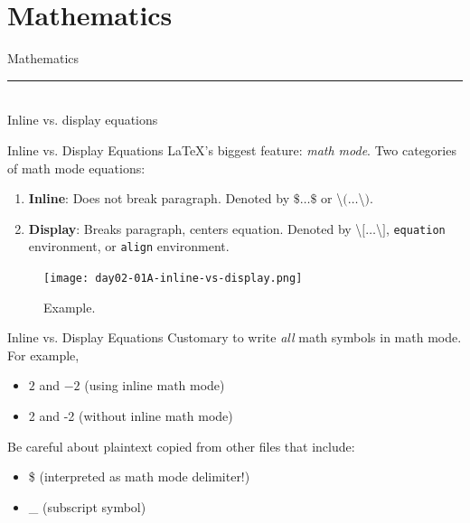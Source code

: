 \documentclass{beamer}
\begin{document}
{  \section{Mathematics}

  \begin{frame}[plain]
    \vfill
    \centering
    \begin{beamercolorbox}[sep=8pt,center,shadow=true,rounded=true]{Mathematics}
      \insertsectionhead\par%
      \color{davisblue}\noindent\rule{10cm}{1pt} \\
      \footnotesize{Inline vs. display equations}
    \end{beamercolorbox}
    \vfill
  \end{frame}

  \begin{frame}{Inline vs. Display Equations}
    \LaTeX's biggest feature: \emph{math mode}. Two categories of math mode equations:
    \begin{enumerate}
      \item \textbf{Inline}: Does not break paragraph. Denoted by $\$\dots\$$ or \textbackslash$(\dots$\textbackslash$)$.
      \item \textbf{Display}: Breaks paragraph, centers equation. Denoted by \textbackslash$[\dots$\textbackslash$]$, \texttt{equation} environment, or \texttt{align} environment.
    \end{enumerate}
    \begin{figure}
      \texttt{[image: day02-01A-inline-vs-display.png]}
      \caption{Example.}
      \label{fig:day02-01}
    \end{figure}
  \end{frame}

  \begin{frame}{Inline vs. Display Equations}
    Customary to write \emph{all} math symbols in math mode. For example,
    \begin{itemize} 
      \item $2$ and $-2$ (using inline math mode)
      \item 2 and -2 (without inline math mode)
    \end{itemize}
    Be careful about plaintext copied from other files that include:
    \begin{itemize}
      \item \$ (interpreted as math mode delimiter!)
      \item \_ (subscript symbol)
    \end{itemize}
  \end{frame}

}
\end{document}

